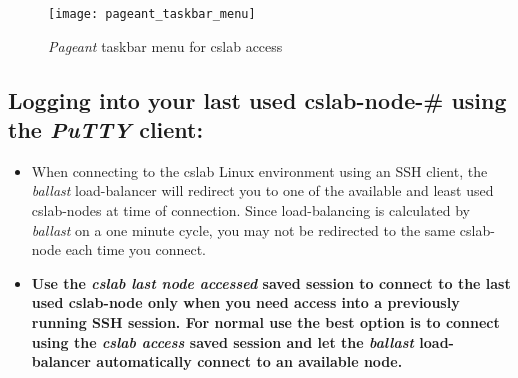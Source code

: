 \documentclass[12pt]{article}
\begin{document}
\begin{flushleft}
\begin{figure}[bh!]
  \centering
  \centering
  \texttt{[image: pageant\_taskbar\_menu]}
\caption{\textit{Pageant} taskbar menu for cslab access}
  \label{fig:pageant}
\end{figure}

\newpage
\subsection*{Logging into your last used cslab-node-\# using the \textit{PuTTY} client:}
\begin{itemize}
  \item When connecting to the cslab Linux environment using an SSH client, the \textit{ballast} load-balancer will redirect you to one of the available and least used cslab-nodes at time of connection. Since load-balancing is calculated by \textit{ballast} on a one minute cycle, you may not be redirected to the same cslab-node each time you connect.

  \item \textbf{Use the \textit{cslab last node accessed} saved session to connect to the last used cslab-node only when you need access into a previously running SSH session. For normal use the best option is to connect using the \textit{cslab access} saved session and let the \textit{ballast} load-balancer automatically connect to an available node.}
\end{itemize}


\end{flushleft}
\end{document}
